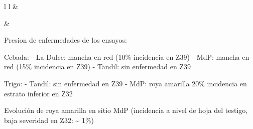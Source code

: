 \documentclass[
  letterpaper,
  DIV=11,
  numbers=noendperiod]{scrreprt}
\begin{document}
\begin{table}[ht]
\begin{centerbox}
\begin{threeparttable}
\begin{tabular}{l l}
 &
 \tabularnewline[-0.5pt]


\hhline{}

 &
 \tabularnewline[-0.5pt]


\end{tabular}
\end{threeparttable}\par\end{centerbox}

\end{table}
 

Presion de enfermedades de los ensayos:

Cebada: - La Dulce: mancha en red (10\% incidencia en Z39) - MdP: mancha
en red (15\% incidencia en Z39) - Tandil: sin enfermedad en Z39

Trigo: - Tandil: sin enfermedad en Z39 - MdP: roya amarilla 20\%
incidencia en estrato inferior en Z32

Evolución de roya amarilla en sitio MdP (incidencia a nivel de hoja del
testigo, baja severidad en Z32: \textasciitilde{} 1\%)
\end{document}
